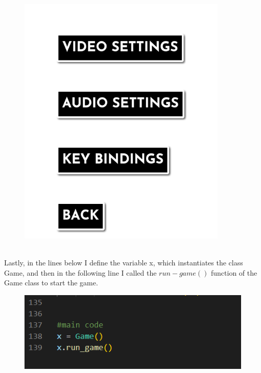 \documentclass[12pt]{article}
\begin{document}
\begin{figure}[H]
    \includegraphics[width = 10cm]{game class/optmenu.png}
    \centering
\end{figure}\\
Lastly, in the lines below I define the variable x, which instantiates the class Game, and then in the following line I called the $run-game()$ function of the Game class to start the game.
\begin{figure}[H]
    \includegraphics[width = 12cm]{game class/run3.PNG}
    \centering
\end{figure}
\end{document}
